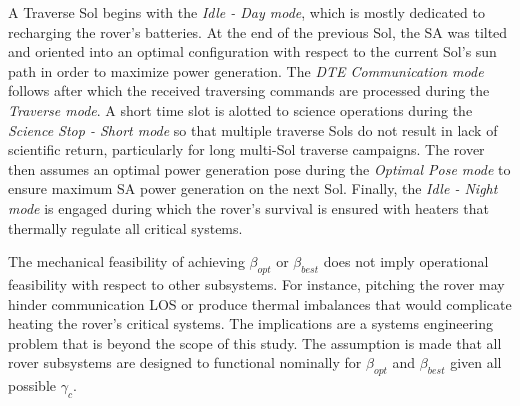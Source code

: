 A Traverse Sol begins with the \textit{Idle - Day mode}, which is mostly dedicated to recharging the rover's batteries. At the end of the previous Sol, the \ac{SA} was tilted and oriented into an optimal configuration with respect to the current Sol's sun path in order to maximize power generation. The \textit{\ac{DTE} Communication mode}  follows after which the received traversing commands are processed during the \textit{Traverse mode}. A short time slot is alotted to science operations during the \textit{Science Stop - Short mode} so that multiple traverse Sols do not result in lack of scientific return, particularly for long multi-Sol traverse campaigns. The rover then assumes an optimal power generation pose during the \textit{Optimal Pose mode} to ensure maximum \ac{SA} power generation on the next Sol. Finally, the \textit{Idle - Night mode} is engaged during which the rover's survival is ensured with heaters that thermally regulate all critical systems.

The mechanical feasibility of achieving $\beta_{opt}$ or $\beta_{best}$ does not imply operational feasibility with respect to other subsystems. For instance, pitching the rover may hinder communication \ac{LOS} or produce thermal imbalances that would complicate heating the rover's critical systems. The implications are a systems engineering problem that is beyond the scope of this study. The assumption is made that all rover subsystems are designed to functional nominally for $\beta_{opt}$ and $\beta_{best}$ given all possible $\gamma_{c}$.

%


